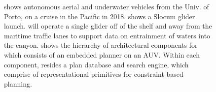 \begin{figure}[!ht]
  \centering 
  \hspace{+0.5cm} 
  \caption{ shows autonomous aerial and
    underwater vehicles from the Univ. of Porto, on a cruise in the
    Pacific in 2018.  %
     shows a \soc Slocum glider launch. \soc will
    operate a single glider off of the shelf and away from the
    maritime traffic lanes to support data on entrainment of waters
    into the \naz canyon.
     shows the hierarchy of architectural
    components for \rx \cite{py10,rajan12,rajan12b} which consists of
    an embedded planner on an AUV. Within each \rx component, resides
    a plan database and search engine, which comprise of
    representational primitives for constraint-based-planning.}
  \label{fig:ai-figs}
\end{figure}

